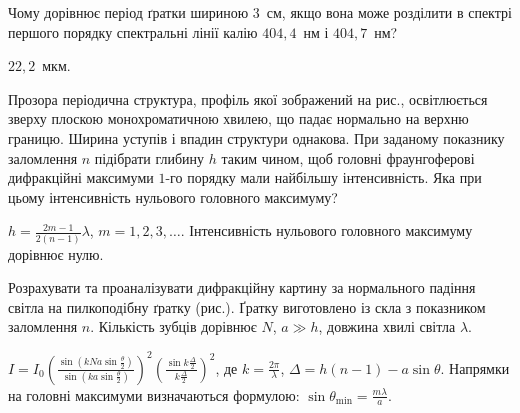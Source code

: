 \begin{problem}%
    Чому дорівнює період ґратки шириною $ 3 $~см, якщо вона може
    розділити в спектрі першого порядку спектральні лінії калію $ 404,4 $~нм і
   $  404,7 $~нм?
    \begin{solution}
       $ 22,2 $~мкм.
    \end{solution}
\end{problem}


\begin{problem}%
    Прозора періодична структура, профіль якої зображений на рис.,
    освітлюється зверху плоскою монохроматичною хвилею, що падає
    нормально на верхню границю. Ширина уступів і впадин структури
    однакова. При заданому показнику заломлення $ n  $ підібрати глибину $ h $
    таким чином, щоб головні фраунгоферові дифракційні максимуми $ 1 $-го
    порядку мали найбільшу інтенсивність. Яка при цьому інтенсивність
    нульового головного максимуму?

    \begin{center}
        
    \end{center}

    \begin{solution}
        $ h = \frac{2m-1}{2(n-1)}\lambda$, $m = 1, 2, 3, \ldots$. Інтенсивність нульового головного максимуму
        дорівнює нулю.
    \end{solution}
\end{problem}


\begin{problem}%
    Розрахувати та проаналізувати дифракційну картину за нормального
    падіння світла на пилкоподібну ґратку (рис.). Ґратку виготовлено із
    скла з показником заломлення $ n $. Кількість зубців дорівнює $ N $, $ a
    \gg h $, довжина хвилі світла $ \lambda $.

    \begin{center}
        
    \end{center}
    \begin{solution}
        $I = I_0\left( \frac{\sin \left( kNa\sin\frac\theta2\right) }{\sin \left( ka\sin\frac\theta2\right) } \right)^2
        \left( \frac{\sin k\frac\Delta2}{k\frac\Delta2} \right)^2 $, де $k = \frac{2\pi}{\lambda}$, $\Delta = h (n-1) - a\sin\theta$. Напрямки на головні максимуми визначаються формулою: $\sin\theta_{\min} = \frac{m\lambda}{a}$.
    \end{solution}
\end{problem}






